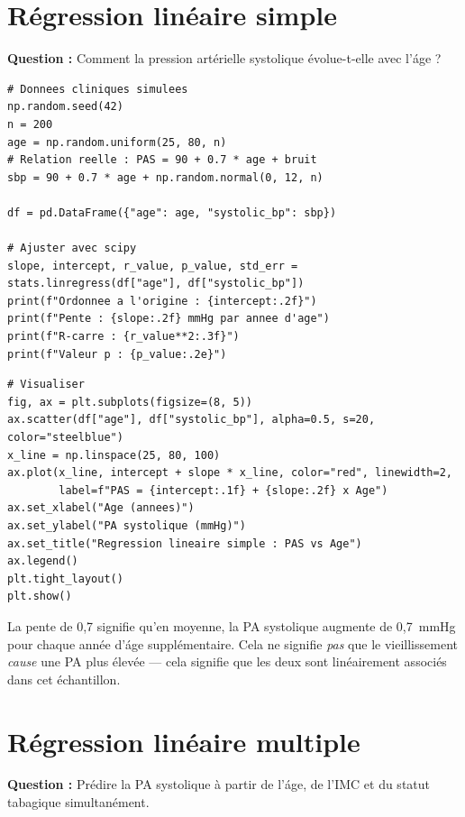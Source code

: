 \section{R\'egression lin\'eaire simple}

\textbf{Question :} Comment la pression art\'erielle systolique \'evolue-t-elle avec l'\'age ?

\begin{verbatim}
# Donnees cliniques simulees
np.random.seed(42)
n = 200
age = np.random.uniform(25, 80, n)
# Relation reelle : PAS = 90 + 0.7 * age + bruit
sbp = 90 + 0.7 * age + np.random.normal(0, 12, n)

df = pd.DataFrame({"age": age, "systolic_bp": sbp})

# Ajuster avec scipy
slope, intercept, r_value, p_value, std_err = stats.linregress(df["age"], df["systolic_bp"])
print(f"Ordonnee a l'origine : {intercept:.2f}")
print(f"Pente : {slope:.2f} mmHg par annee d'age")
print(f"R-carre : {r_value**2:.3f}")
print(f"Valeur p : {p_value:.2e}")
\end{verbatim}

\begin{verbatim}
# Visualiser
fig, ax = plt.subplots(figsize=(8, 5))
ax.scatter(df["age"], df["systolic_bp"], alpha=0.5, s=20, color="steelblue")
x_line = np.linspace(25, 80, 100)
ax.plot(x_line, intercept + slope * x_line, color="red", linewidth=2,
        label=f"PAS = {intercept:.1f} + {slope:.2f} x Age")
ax.set_xlabel("Age (annees)")
ax.set_ylabel("PA systolique (mmHg)")
ax.set_title("Regression lineaire simple : PAS vs Age")
ax.legend()
plt.tight_layout()
plt.show()
\end{verbatim}

\begin{clinicalnote}
La pente de 0,7 signifie qu'en moyenne, la PA systolique augmente de 0,7~mmHg pour chaque ann\'ee d'\'age suppl\'ementaire. Cela ne signifie \emph{pas} que le vieillissement \emph{cause} une PA plus \'elev\'ee --- cela signifie que les deux sont lin\'eairement associ\'es dans cet \'echantillon.
\end{clinicalnote}

\section{R\'egression lin\'eaire multiple}

\textbf{Question :} Pr\'edire la PA systolique \`a partir de l'\'age, de l'IMC et du statut tabagique simultan\'ement.

